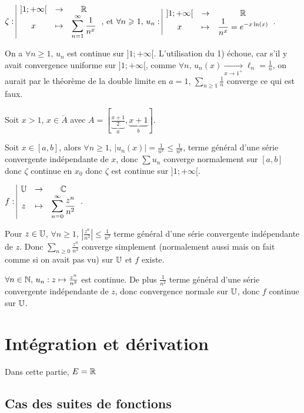 \begin{exemple}
    $\displaystyle \zeta: \space \begin{array}{|ccc} \displaystyle ]1; +\infty[ & \to & \displaystyle \mathbb{R} \\ \displaystyle x & \mapsto & \displaystyle \sum_{n = 1}^{\infty} \frac 1 {n^x} \end{array}$, et 
    $\forall n \geqslant 1, \, u_n: \space \begin{array}{|ccc} \displaystyle ]1; +\infty[ & \to & \displaystyle \mathbb{R} \\ \displaystyle x & \mapsto & \displaystyle \frac 1 {n^x} = e^{-x \ln(x)} \end{array}$. 

    On a $\forall n \geqslant 1, \, u_n$ est continue sur $]1; +\infty[$. L'utilisation du 1) échoue, car 
    s'il y avait convergence uniforme sur $]1; +\infty[$, comme $\forall n, \, u_n(x) \xrightarrow[x \to 1^+]{} \ell_n = \frac 1 n$,
    on aurait par le théorème de la double limite en $a = 1$, $\sum_{n \geqslant 1 } \frac 1 n $ converge ce qui est faux. 

    \svspace Soit $x > 1$, $x \in \mathring A$ avec $A = \left[ \underbrace{\frac{x + 1}{2}}_{ a }, \underbrace{x + 1}_{ b} \right]$.

    Soit $x \in [a, b]$, alors $\forall n \geqslant 1, \, \left| u_n(x) \right| = \frac 1 {n^x} \leqslant \frac 1 {n^a}$, terme 
    général d'une série convergente indépendante de $x$, donc $\sum u_n$ converge normalement sur $[a, b]$ 
    donc $\zeta$ continue en $x_0$ donc $\zeta$ est continue sur $]1; +\infty[$.
\end{exemple}


\begin{exemple}
    $f: \space \begin{array}{|ccc} \displaystyle \mathbb{U} & \to & \displaystyle \mathbb{C} \\ \displaystyle z & \mapsto & \displaystyle \sum_{n = 0}^{\infty} \frac{z^n }{n^2} \end{array}$. 

    Pour $z \in \mathbb{U}$, $\forall n \geqslant 1, \, \left| \frac{z^n }{n^2} \right| \leqslant \frac 1 {n^2}$ terme général
    d'une série convergente indépendante de $z$. Donc $\sum_{n \geqslant 0} \frac{z^n }{n^2}$ converge simplement (normalement aussi mais on fait comme si 
    on avait pas vu) sur $\mathbb{U}$ et $f$ existe. 

    $\forall n \in \mathbb{N}, \, u_n : z \mapsto \frac{z^n }{n^2}$ est continue. De plus 
    $\frac 1 {n^2}$ terme général d'une série convergente indépendante de $z$, donc convergence 
    normale sur $\mathbb{U}$, donc $f$ continue sur $\mathbb{U}$.
\end{exemple}

\section{Intégration et dérivation}
Dans cette partie, $E = \mathbb{R}$
\subsection{Cas des suites de fonctions}

